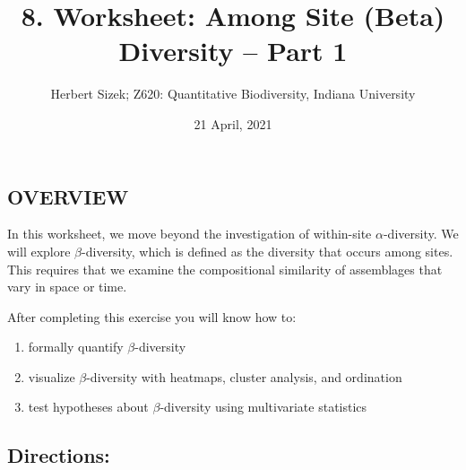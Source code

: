 \documentclass[
]{article}
\title{8. Worksheet: Among Site (Beta) Diversity -- Part 1}
\author{Herbert Sizek; Z620: Quantitative Biodiversity, Indiana
University}
\date{21 April, 2021}
\providecommand{\tightlist}{%
  \setlength{\itemsep}{0pt}\setlength{\parskip}{0pt}}
\begin{document}
\maketitle

\hypertarget{overview}{%
\subsection{OVERVIEW}\label{overview}}

In this worksheet, we move beyond the investigation of within-site
\(\alpha\)-diversity. We will explore \(\beta\)-diversity, which is
defined as the diversity that occurs among sites. This requires that we
examine the compositional similarity of assemblages that vary in space
or time.

After completing this exercise you will know how to:

\begin{enumerate}
\def\labelenumi{\arabic{enumi}.}
\tightlist
\item
  formally quantify \(\beta\)-diversity
\item
  visualize \(\beta\)-diversity with heatmaps, cluster analysis, and
  ordination
\item
  test hypotheses about \(\beta\)-diversity using multivariate
  statistics
\end{enumerate}

\hypertarget{directions}{%
\subsection{Directions:}\label{directions}}
\end{document}
